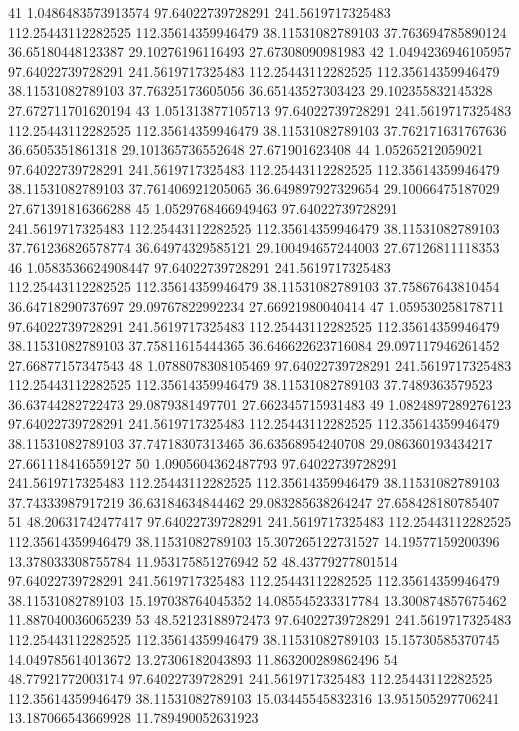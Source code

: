 {41 1.0486483573913574 97.64022739728291 241.5619717325483 112.25443112282525 112.35614359946479 38.11531082789103 37.763694785890124 36.65180448123387 29.10276196116493 27.67308090981983
42 1.0494236946105957 97.64022739728291 241.5619717325483 112.25443112282525 112.35614359946479 38.11531082789103 37.76325173605056 36.65143527303423 29.102355832145328 27.672711701620194
43 1.051313877105713 97.64022739728291 241.5619717325483 112.25443112282525 112.35614359946479 38.11531082789103 37.762171631767636 36.6505351861318 29.101365736552648 27.671901623408
44 1.05265212059021 97.64022739728291 241.5619717325483 112.25443112282525 112.35614359946479 38.11531082789103 37.761406921205065 36.649897927329654 29.10066475187029 27.671391816366288
45 1.0529768466949463 97.64022739728291 241.5619717325483 112.25443112282525 112.35614359946479 38.11531082789103 37.761236826578774 36.64974329585121 29.100494657244003 27.67126811118353
46 1.0583536624908447 97.64022739728291 241.5619717325483 112.25443112282525 112.35614359946479 38.11531082789103 37.75867643810454 36.64718290737697 29.09767822992234 27.66921980040414
47 1.059530258178711 97.64022739728291 241.5619717325483 112.25443112282525 112.35614359946479 38.11531082789103 37.75811615444365 36.646622623716084 29.097117946261452 27.66877157347543
48 1.0788078308105469 97.64022739728291 241.5619717325483 112.25443112282525 112.35614359946479 38.11531082789103 37.7489363579523 36.63744282722473 29.0879381497701 27.662345715931483
49 1.0824897289276123 97.64022739728291 241.5619717325483 112.25443112282525 112.35614359946479 38.11531082789103 37.74718307313465 36.63568954240708 29.086360193434217 27.661118416559127
50 1.0905604362487793 97.64022739728291 241.5619717325483 112.25443112282525 112.35614359946479 38.11531082789103 37.74333987917219 36.63184634844462 29.083285638264247 27.658428180785407
51 48.20631742477417 97.64022739728291 241.5619717325483 112.25443112282525 112.35614359946479 38.11531082789103 15.307265122731527 14.19577159200396 13.378033308755784 11.953175851276942
52 48.43779277801514 97.64022739728291 241.5619717325483 112.25443112282525 112.35614359946479 38.11531082789103 15.197038764045352 14.085545233317784 13.300874857675462 11.887040036065239
53 48.52123188972473 97.64022739728291 241.5619717325483 112.25443112282525 112.35614359946479 38.11531082789103 15.15730585370745 14.049785614013672 13.27306182043893 11.863200289862496
54 48.77921772003174 97.64022739728291 241.5619717325483 112.25443112282525 112.35614359946479 38.11531082789103 15.03445545832316 13.951505297706241 13.187066543669928 11.789490052631923
}
